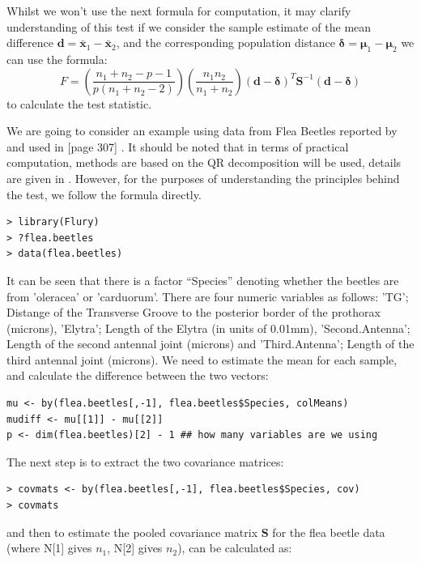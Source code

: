 Whilst we won't use the next formula for computation, it may clarify understanding of this test if we consider the sample estimate of the mean difference $\boldsymbol{d} = \bar{\boldsymbol{x}}_{1} - \bar{\boldsymbol{x}}_{2}$, and the corresponding population distance $\boldsymbol{\delta} = \boldsymbol{\mu}_{1} - \boldsymbol{\mu}_{2}$ we can use the formula:
\begin{displaymath}
F = \left( \frac{n_{1} + n_{2} - p - 1}{p(n_{1} + n_{2} - 2)} \right) \left(\frac{n_{1}n_{2}}{n_{1}+n_{2}} \right) (\boldsymbol{d} - \boldsymbol{\delta})^{T}\boldsymbol{S}^{-1}(\boldsymbol{d} - \boldsymbol{\delta})
\end{displaymath}
to calculate the test statistic. 




We are going to consider an example using data from Flea Beetles reported by \cite{Lubischew:1962} and used in [page 307] \cite{Flury:1997}.   It should be noted that in terms of practical computation, methods are based on the QR decomposition will be used, details are given in \cite{Seber:1984}.   However, for the purposes of understanding the principles behind the test, we follow the formula directly.


\singlespacing
\begin{verbatim}
> library(Flury)
> ?flea.beetles
> data(flea.beetles)
\end{verbatim}
\onehalfspacing

It can be seen that there is a factor ``Species'' denoting whether the beetles are from 'oleracea' or 'carduorum'.   There are four numeric variables as follows: 'TG'; Distange of the Transverse Groove to the posterior border of
          the prothorax (microns), 'Elytra'; Length of the Elytra (in units of 0.01mm), 'Second.Antenna'; Length of the second antennal joint (microns) and 'Third.Antenna'; Length of the third antennal joint (microns).   We need to estimate the mean for each sample, and calculate the difference between the two vectors:
\singlespacing
\begin{verbatim}
mu <- by(flea.beetles[,-1], flea.beetles$Species, colMeans)
mudiff <- mu[[1]] - mu[[2]]
p <- dim(flea.beetles)[2] - 1 ## how many variables are we using
\end{verbatim}
\onehalfspacing

The next step is to extract the two covariance matrices:

\singlespacing
\begin{verbatim}
> covmats <- by(flea.beetles[,-1], flea.beetles$Species, cov)
> covmats
\end{verbatim}
\onehalfspacing
and then to estimate the pooled covariance matrix $\boldsymbol{S}$ for the flea beetle data (where N[1] gives $n_{1}$,  N[2] gives $n_{2}$), can be calculated as:

